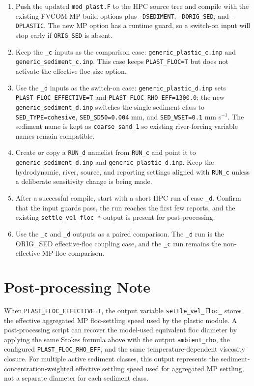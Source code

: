 \documentclass[11pt]{article}
\begin{document}
\begin{enumerate}
  \item Push the updated \texttt{mod\_plast.F} to the HPC source tree and compile
        with the existing FVCOM-MP build options plus \texttt{-DSEDIMENT},
        \texttt{-DORIG\_SED}, and \texttt{-DPLASTIC}.  The new MP option has a
        runtime guard, so a switch-on input will stop early if \texttt{ORIG\_SED}
        is absent.
  \item Keep the \texttt{\_c} inputs as the comparison case:
        \texttt{generic\_plastic\_c.inp} and
        \texttt{generic\_sediment\_c.inp}.  This case keeps
        \texttt{PLAST\_FLOC=T} but does not activate the effective floc-size
        option.
  \item Use the \texttt{\_d} inputs as the switch-on case:
        \texttt{generic\_plastic\_d.inp} sets
        \texttt{PLAST\_FLOC\_EFFECTIVE=T} and
        \texttt{PLAST\_FLOC\_RHO\_EFF=1300.0}; the new
        \texttt{generic\_sediment\_d.inp} switches the single sediment class to
        \texttt{SED\_TYPE=cohesive}, \texttt{SED\_SD50=0.004} mm, and
        \texttt{SED\_WSET=0.1} mm s$^{-1}$.  The sediment name is kept as
        \texttt{coarse\_sand\_1} so existing river-forcing variable names remain
        compatible.
  \item Create or copy a \texttt{RUN\_d} namelist from \texttt{RUN\_c} and point
        it to \texttt{generic\_sediment\_d.inp} and
        \texttt{generic\_plastic\_d.inp}.  Keep the hydrodynamic, river, source,
        and reporting settings aligned with \texttt{RUN\_c} unless a deliberate
        sensitivity change is being made.
  \item After a successful compile, start with a short HPC run of case
        \texttt{\_d}.  Confirm that the input guards pass, the run reaches the
        first few reports, and the existing \texttt{settle\_vel\_floc\_*}
        output is present for post-processing.
  \item Use the \texttt{\_c} and \texttt{\_d} outputs as a paired comparison.
        The \texttt{\_d} run is the ORIG\_SED effective-floc coupling case, and
        the \texttt{\_c} run remains the non-effective MP-floc comparison.
\end{enumerate}

\section*{Post-processing Note}

When \texttt{PLAST\_FLOC\_EFFECTIVE=T}, the output variable
\texttt{settle\_vel\_floc\_<plastic name>} stores the effective aggregated MP
floc-settling speed used by the plastic module.  A post-processing script can
recover the model-used equivalent floc diameter by applying the same Stokes
formula above with the output \texttt{ambient\_rho}, the configured
\texttt{PLAST\_FLOC\_RHO\_EFF}, and the same temperature-dependent viscosity
closure.  For multiple active sediment classes, this output represents the
sediment-concentration-weighted effective settling speed used for aggregated MP
settling, not a separate diameter for each sediment class.
\end{document}
